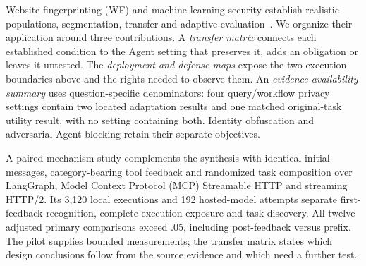 Website fingerprinting (WF) and machine-learning security establish realistic populations, segmentation, transfer and adaptive evaluation~\cite{juarez2014critical,wang2016realistic,dyer2012peekaboo,mathews2023critical,arp2022dos,tramer2020adaptive}. We organize their application around three contributions. A \emph{transfer matrix} connects each established condition to the Agent setting that preserves it, adds an obligation or leaves it untested. The \emph{deployment and defense maps} expose the two execution boundaries above and the rights needed to observe them. An \emph{evidence-availability summary} uses question-specific denominators: four query/workflow privacy settings contain two located adaptation results and one matched original-task utility result, with no setting containing both. Identity obfuscation and adversarial-Agent blocking retain their separate objectives.

A paired mechanism study complements the synthesis with identical initial messages, category-bearing tool feedback and randomized task composition over LangGraph, Model Context Protocol (MCP) Streamable HTTP and streaming HTTP/2. Its 3,120 local executions and 192 hosted-model attempts separate first-feedback recognition, complete-execution exposure and task discovery. All twelve adjusted primary comparisons exceed .05, including post-feedback versus prefix. The pilot supplies bounded measurements; the transfer matrix states which design conclusions follow from the source evidence and which need a further test.
